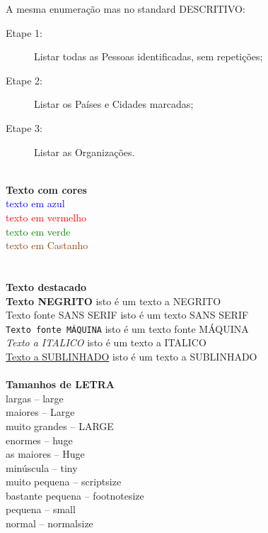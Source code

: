 \documentclass[12pt,a4paper]{report}%
\begin{document}
A mesma enumeração mas no standard DESCRITIVO:
\begin{description}
\item[Etape 1:] Listar todas as Pessoas identificadas, sem repetições;
\item[Etape 2:] Listar os Países e Cidades marcadas;
\item[Etape 3:] Listar as Organizações.\\\\
\end{description}


\textbf{Texto com cores}\\

\textcolor{blue}{texto em azul}\\
\textcolor{red}{texto em vermelho} \\
\textcolor{green}{texto em verde} \\
\textcolor{saddlebrown}{texto em Castanho} \\\\\\

\textbf{Texto destacado}\\

 \textbf{Texto NEGRITO} isto é um texto a NEGRITO \\%
 \textsf{Texto fonte SANS SERIF} isto é um texto SANS SERIF \\ %
 \texttt{Texto fonte MÁQUINA}  isto é um texto fonte MÁQUINA\\ %
 \textit{Texto a ITALICO} isto é um texto a ITALICO\\ %
 \underline{Texto a SUBLINHADO} isto é um texto a SUBLINHADO \\\\ %

\textbf{Tamanhos de LETRA}\\

\large{largas -- large}\\
\Large{maiores -- Large}\\
\LARGE{muito grandes -- LARGE}\\
\huge{enormes --  huge}\\
\Huge{as maiores -- Huge}\\
\tiny{minúscula  -- tiny}\\
\scriptsize{muito pequena -- scriptsize} \\
\footnotesize{bastante pequena  -- footnotesize}\\
\small{pequena -- small}\\
\normalsize{normal -- normalsize}\\\\
\end{document}
